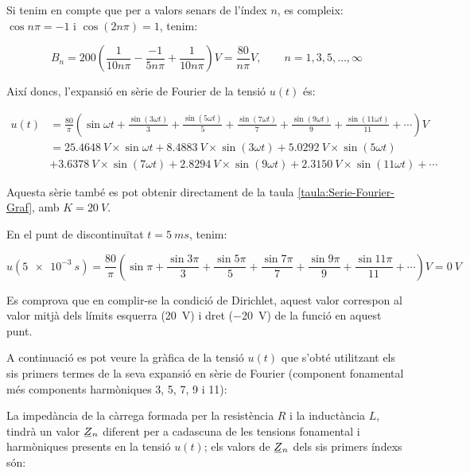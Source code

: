 \begin{exemple}
    Si tenim en compte que per a valors senars de l'índex $n$, es
    compleix: $\cos n \pi = -1$ i $\cos (2 n \pi) = 1$, tenim:

    \[
        B_n = 200 \left( \frac{1}{10 n \pi} - \frac{-1}{5 n \pi} +
        \frac{1}{10 n \pi} \right) \unit{V} = \frac{80}{n \pi} \unit{V},
        \qquad n=1,3,5,\ldots,\infty
    \]

    Així doncs, l'expansió en sèrie de Fourier de la tensió $u(t)$ és:

    \[\begin{split}
        u(t) &= \frac{80}{\pi} \left( \sin \omega t + \frac{\sin (3 \omega t)}{3} +
        \frac{\sin (5 \omega t)}{5} + \frac{\sin (7 \omega t)}{7} +
        \frac{\sin (9 \omega t)}{9} + \frac{\sin (11 \omega t)}{11} +\cdots\right) \unit{V}\\
        &= \qty{25,4648}{V} \times \sin \omega t + \qty{8,4883}{V} \times \sin (3 \omega t) + \qty{5,0292}{V} \times \sin (5 \omega t) \\
        &+ \qty{3,6378}{V} \times \sin (7 \omega t) + \qty{2,8294}{V} \times \sin (9 \omega t) + \qty{2,3150}{V} \times \sin (11 \omega t) +\cdots
    \end{split}\]

  
    Aquesta sèrie també es pot obtenir directament de la taula \vref{taula:Serie-Fourier-Graf}, amb $K=\qty{20}{V}$.

    En el punt de discontinuïtat $t=\qty{5}{ms}$, tenim:

    \[
        u(\qty{5e-3}{s}) =\frac{80}{\pi} \left( \sin \pi + \frac{\sin 3 \pi}{3} +
        \frac{\sin 5 \pi}{5} + \frac{\sin 7 \pi}{7} +
        \frac{\sin 9 \pi}{9} +\frac{\sin 11 \pi}{11}+\cdots\right) \unit{V}= \qty{0}{V}
    \]

    Es comprova que en complir-se la condició de Dirichlet, aquest valor
    correspon al valor mitjà dels límits esquerra (\qty{20}{V}) i dret (\qty{-20}{V})  de
    la funció en aquest punt.

    A continuació es pot veure la gràfica de la tensió $u(t)$ que
    s'obté utilitzant els sis primers termes de la seva expansió en sèrie de Fourier (component fonamental més components harmòniques 3, 5, 7, 9 i 11):

    \begin{center}
        
    \end{center}

    La impedància de la càrrega formada per la resistència $R$ i la
    inductància $L$, tindrà un valor $\cmplx{Z}_n$ diferent per a
    cadascuna de les tensions fonamental i harmòniques presents en la
    tensió $u(t)$; els valors de $\cmplx{Z}_n$ dels sis primers índexs són:
    

\end{exemple}
